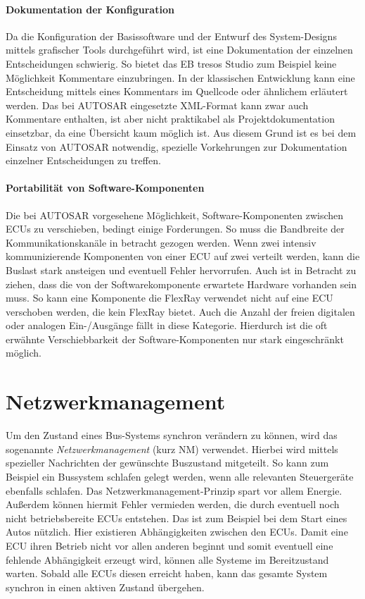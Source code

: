 \documentclass[
  a4paper,					    %
  twoside,
  DIV=calc,     				%
  bibliography=totoc,
  cleardoublepage=empty,
  ngerman,     					%
  final       					%
]{scrbook}
\begin{document}
\paragraph{Dokumentation der Konfiguration}
Da die Konfiguration der Basissoftware und der Entwurf des System-Designs mittels grafischer Tools durchgeführt wird, ist eine Dokumentation der einzelnen Entscheidungen schwierig.\cite[Seite 182 f.]{SE_Autosar} So bietet das EB tresos Studio zum Beispiel keine Möglichkeit Kommentare einzubringen. In der klassischen Entwicklung kann eine Entscheidung mittels eines Kommentars im Quellcode oder ähnlichem erläutert werden. Das bei AUTOSAR eingesetzte XML-Format kann zwar auch Kommentare enthalten, ist aber nicht praktikabel als Projektdokumentation einsetzbar, da eine Übersicht kaum möglich ist. Aus diesem Grund ist es bei dem Einsatz von AUTOSAR notwendig, spezielle Vorkehrungen zur Dokumentation einzelner Entscheidungen zu treffen.

\paragraph{Portabilität von Software-Komponenten}
Die bei AUTOSAR vorgesehene Möglichkeit, Software-Komponenten zwischen ECUs zu verschieben, bedingt einige Forderungen. So muss die Bandbreite der Kommunikationskanäle in betracht gezogen werden. Wenn zwei intensiv kommunizierende Komponenten von einer ECU auf zwei verteilt werden, kann die Buslast stark ansteigen und eventuell Fehler hervorrufen. Auch ist in Betracht zu ziehen, dass die von der Softwarekomponente erwartete Hardware vorhanden sein muss. So kann eine Komponente die FlexRay verwendet nicht auf eine ECU verschoben werden, die kein FlexRay bietet. Auch die Anzahl der freien digitalen oder analogen Ein-/Ausgänge fällt in diese Kategorie. Hierdurch ist die oft erwähnte Verschiebbarkeit der Software-Komponenten nur stark eingeschränkt möglich.






\section{Netzwerkmanagement}
\label{sec:Netzwerkmanagement}
Um den Zustand eines Bus-Systems synchron verändern zu können, wird das sogenannte \emph{Netzwerkmanagement} (kurz NM) verwendet. Hierbei wird mittels spezieller Nachrichten der gewünschte Buszustand mitgeteilt. So kann zum Beispiel ein Bussystem schlafen gelegt werden, wenn alle relevanten Steuergeräte ebenfalls schlafen. Das Netzwerkmanagement-Prinzip spart vor allem Energie. Außerdem können hiermit Fehler vermieden werden, die durch eventuell noch nicht betriebsbereite ECUs entstehen. Das ist zum Beispiel bei dem Start eines Autos nützlich. Hier existieren Abhängigkeiten zwischen den ECUs. Damit eine ECU ihren Betrieb nicht vor allen anderen beginnt und somit eventuell eine fehlende Abhängigkeit erzeugt wird, können alle Systeme im Bereitzustand warten. Sobald alle ECUs diesen erreicht haben, kann das gesamte System synchron in einen aktiven Zustand übergehen.
\end{document}

